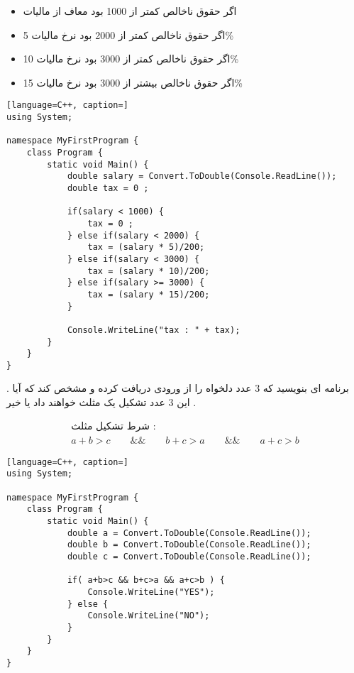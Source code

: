 \documentclass[12pt]{article}
\begin{document}
\begin{itemize}
	\item اگر حقوق ناخالص کمتر از 1000 بود معاف از مالیات
	\item اگر حقوق ناخالص کمتر از 2000 بود نرخ مالیات
	 5\%
	\item اگر حقوق ناخالص کمتر از 3000 بود نرخ مالیات
	10\%
	\item اگر حقوق ناخالص بیشتر از 3000 بود نرخ مالیات
	15\%
\end{itemize}





\begin{latin}
\begin{lstlisting}[language=C++, caption=]
using System;

namespace MyFirstProgram {
	class Program {
		static void Main() {
			double salary = Convert.ToDouble(Console.ReadLine());
			double tax = 0 ;
			
			if(salary < 1000) {
				tax = 0 ;
			} else if(salary < 2000) {
				tax = (salary * 5)/200;
			} else if(salary < 3000) { 
				tax = (salary * 10)/200;
			} else if(salary >= 3000) {
				tax = (salary * 15)/200;
			}
			
			Console.WriteLine("tax : " + tax);
		}
	}
}
\end{lstlisting}
\end{latin}







\newpage

 . برنامه ای بنویسید که 3 عدد دلخواه را از ورودی دریافت کرده و مشخص کند که آیا این 3 عدد تشکیل یک مثلث خواهند داد یا خیر .



\begin{align*}
\text{شرط تشکیل مثلث : } \\ 
a+b>c \qquad \&\& \qquad b+c>a \qquad \&\& \qquad a+c>b
\end{align*}






\begin{latin}
\begin{lstlisting}[language=C++, caption=]
using System;

namespace MyFirstProgram {
	class Program {
		static void Main() {
			double a = Convert.ToDouble(Console.ReadLine());
			double b = Convert.ToDouble(Console.ReadLine());
			double c = Convert.ToDouble(Console.ReadLine());

			if( a+b>c && b+c>a && a+c>b ) {
				Console.WriteLine("YES");
			} else {
				Console.WriteLine("NO");
			}
		}
	}
}
\end{lstlisting}
\end{latin}
\end{document}
